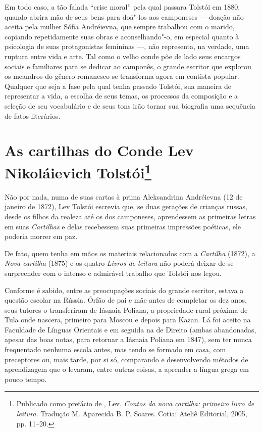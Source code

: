 Em todo caso, a tão falada ``crise moral'' pela qual passara
Tolstói em 1880, quando abrira mão de seus bens para doá"-los
aos camponeses --- doação não aceita pela mulher Sófia Andréievna,
que sempre trabalhou com o marido, copiando repetidamente suas
obras e aconselhando"-o, em especial quanto à psicologia de suas
protagonistas femininas ---, não representa, na verdade, uma
ruptura entre vida e arte. Tal como o velho conde põe de lado
seus encargos sociais e familiares para se dedicar ao camponês,
o grande escritor que explorou os meandros do gênero romanesco
se transforma agora em contista popular. Qualquer que seja a
fase pela qual tenha passado Tolstói, sua maneira de
representar a vida, a escolha de seus temas, os processos da
composição e a seleção de seu vocabulário e de seus tons irão
tornar sua biografia uma sequência de fatos literários.

\chapter{As cartilhas do Conde Lev Nikoláievich Tolstói\footnote{Publicado como prefácio de \protect{}, Lev. \emph{Contos da nova cartilha: primeiro livro de leitura}. Tradução M. Aparecida B. P. Soares. Cotia: Ateliê Editorial, 2005, pp. 11--20.}}
\label{cartilhas}

Não por nada, numa de suas cartas à prima Aleksandrina Andréievna
(12 de janeiro de 1872), Lev Tolstói escrevia que, se
duas gerações de crianças russas, desde os filhos da realeza até
os dos camponeses, aprendessem as primeiras letras em suas
\emph{Cartilhas} e delas recebessem suas primeiras impressões
poéticas, ele poderia morrer em paz.

De fato, quem tenha em mãos os materiais relacionados com
a \emph{Cartilha} (1872), a \emph{Nova cartilha} (1875) e os
quatro \emph{Livros de leitura} não poderá deixar de se
surpreender com o intenso e admirável trabalho que Tolstói nos legou.

Conforme é sabido, entre as preocupações sociais do grande
escritor, estava a questão escolar na Rússia. Órfão de pai e
mãe antes de completar os dez anos, seus tutores o transferiram
de Iásnaia Poliana, a propriedade rural próxima de Tula onde
nascera, primeiro para Moscou e depois para Kazan. Lá foi
aceito na Faculdade de Línguas Orientais e em seguida na de
Direito (ambas abandonadas, apesar das boas notas, para retornar
a Iásnaia Poliana em 1847), sem ter nunca frequentado nenhuma
escola antes, mas tendo se formado em casa, com preceptores ou,
mais tarde, por si só, comparando e desenvolvendo métodos de
aprendizagem que o levaram, entre outras coisas, a aprender a
língua grega em pouco tempo. 

